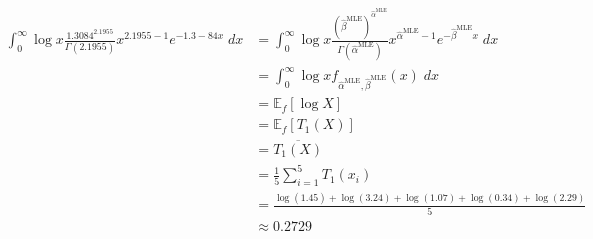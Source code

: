 \documentclass[11pt]{report}
\newcommand{\E}{\mathbb{E}}
\begin{document}
\begin{enumerate}[1.]
\begin{enumerate}
                    \color{blue}
                    \begin{align*}
                        \int_0^{\infty} \log x \frac{1.3084^{2.1955}}{\Gamma(2.1955)}x^{2.1955-1}e^{-1.3-84x}\; dx & = \int_0^{\infty} \log x \frac{(\hat \beta^{\text{MLE}})^{\hat \alpha^{\text{MLE}}}}{\Gamma(\hat \alpha^{\text{MLE}})} x^{\hat \alpha^{\text{MLE}}-1} e^{-\hat \beta^{\text{MLE}}x} \; dx \\
                                                                                                                   & = \int_0^{\infty} \log x f_{\hat \alpha^{\text{MLE}}, \hat \beta^{\text{MLE}}}(x)\; dx                                                                                                    \\
                                                                                                                   & = \E_f[\log X]                                                                                                                                                                            \\
                                                                                                                   & = \E_f[T_1(X)]                                                                                                                                                                            \\
                                                                                                                   & = \overline{T_1(X)}                                                                                                                                                                       \\
                                                                                                                   & = \frac{1}{5} \sum_{i=1}^5 T_1(x_i)                                                                                                                                                       \\
                                                                                                                   & = \frac{\log(1.45) + \log(3.24) + \log(1.07) + \log(0.34) + \log(2.29)}{5}                                                                                                                \\
                                                                                                                   & \approx 0.2729
                    \end{align*}
                    \color{black}
          \end{enumerate}



\end{enumerate}
\end{document}
